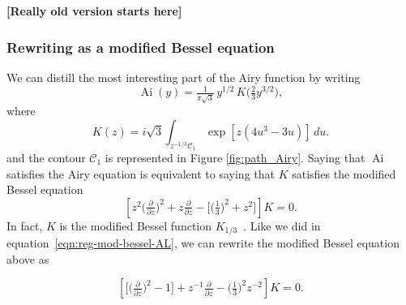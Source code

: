 \documentclass{article}
\DeclareMathOperator{\Ai}{Ai}
\theoremstyle{definition}
\theoremstyle{plain}
\newenvironment{todo}{\color{Coral}}{\color{black}}
\newenvironment{old}{\color{RoyalBlue}}{\color{black}}
\begin{document}
%
\begin{old}
\begin{todo}\par\textbf{[Really old version starts here]}\end{todo}
\subsubsection{Rewriting as a modified Bessel equation}
We can distill the most interesting part of the Airy function by writing
\[ \Ai(y) = \tfrac{1}{\pi\sqrt{3}}\,y^{1/2}\,K\big(\tfrac{2}{3} y^{3/2}\big), \]
where
\begin{equation}\label{integral:mod-bessel}
K(z) = i\sqrt{3} \int_{z^{-1/3}\mathcal{C}_1} \exp\left[z \left(4u^3 - 3u\right)\right]\,du.
\end{equation}
and the contour $\mathcal{C}_1$ is represented in Figure \ref{fig:path_Airy}.
Saying that $\Ai$ satisfies the Airy equation is equivalent to saying that $K$ satisfies the modified Bessel equation
\begin{equation}\label{eqn:mod-bessel-1/3}
\left[z^2 \big(\tfrac{\partial}{\partial z}\big)^2 + z \tfrac{\partial}{\partial z} - \big[\big(\tfrac{1}{3}\big)^2 + z^2\big]\right] K = 0.
\end{equation}
In fact, $K$ is the modified Bessel function $K_{1/3}$~\cite[equation~9.6.1]{dlmf}.
Like we did in equation~\eqref{eqn:reg-mod-bessel-AL}, we can rewrite the modified Bessel equation above as 

\begin{equation}\label{eqn:reg-mod-bessel}
\left[ \big[ \big(\tfrac{\partial}{\partial z}\big)^2 - 1 \big] + z^{-1} \tfrac{\partial}{\partial z} - \big(\tfrac{1}{3}\big)^2 z^{-2} \right] K = 0.
\end{equation}
%

\end{old}
\end{document}
